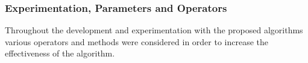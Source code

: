\documentclass[11pt]{article}
\begin{document}
    \subsubsection{Experimentation, Parameters and Operators}
    Throughout the development and experimentation with the proposed algorithms various operators and methods were considered in order to increase the effectiveness of the algorithm.
    
    
    
    
    
    
    \clearpage
    
    
    

    
\end{document}
